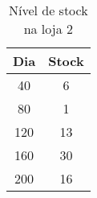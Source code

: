 \begin{table}[htpb]
\begin{center}
\begin{tabular}{cc}
\toprule
Dia & Stock	       \\ \midrule
40 & 6                 \\ 
80 & 1                 \\ 
120 & 13               \\ 
160 & 30               \\ 
200 & 16     	       \\ 
\bottomrule
\end{tabular}
\end{center}
\caption{Nível de stock na loja 2}
\label{tab:tabela3}
\end{table}

